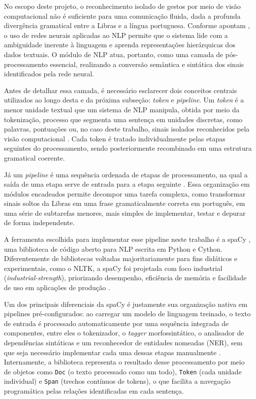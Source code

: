 \documentclass[
    12pt,                %
    openright,           %
    oneside,             %
    a4paper,             %
    english,             %
    brazil               %
]{abntex2}
\begin{document}
No escopo deste projeto, o reconhecimento isolado de gestos por meio de visão computacional não é suficiente para uma comunicação fluida, dada a profunda divergência gramatical entre a Libras e a língua portuguesa. Conforme apontam , o uso de redes neurais aplicadas ao NLP permite que o sistema lide com a ambiguidade inerente à linguagem e aprenda representações hierárquicas dos dados textuais. O módulo de NLP atua, portanto, como uma camada de pós-processamento essencial, realizando a conversão semântica e sintática dos sinais identificados pela rede neural.

Antes de detalhar essa camada, é necessário esclarecer dois conceitos centrais utilizados ao longo desta e da próxima subseção: \textit{token} e \textit{pipeline}. Um \textit{token} é a menor unidade textual que um sistema de NLP manipula, obtida por meio da tokenização, processo que segmenta uma sentença em unidades discretas, como palavras, pontuações ou, no caso deste trabalho, sinais isolados reconhecidos pela visão computacional \cite{Bird2009}. Cada token é tratado individualmente pelas etapas seguintes do processamento, sendo posteriormente recombinado em uma estrutura gramatical coerente. 

Já um \textit{pipeline} é uma sequência ordenada de etapas de processamento, na qual a saída de uma etapa serve de entrada para a etapa seguinte \cite{Honnibal2020}. Essa organização em módulos encadeados permite decompor uma tarefa complexa, como transformar sinais soltos da Libras em uma frase gramaticalmente correta em português, em uma série de subtarefas menores, mais simples de implementar, testar e depurar de forma independente.

A ferramenta escolhida para implementar esse pipeline neste trabalho é a spaCy \cite{Honnibal2020}, uma biblioteca de código aberto para NLP escrita em Python e Cython. Diferentemente de bibliotecas voltadas majoritariamente para fins didáticos e experimentais, como o NLTK, a spaCy foi projetada com foco industrial (\textit{industrial-strength}), priorizando desempenho, eficiência de memória e facilidade de uso em aplicações de produção \cite{Honnibal2020}.

Um dos principais diferenciais da spaCy é justamente sua organização nativa em pipelines pré-configurados: ao carregar um modelo de linguagem treinado, o texto de entrada é processado automaticamente por uma sequência integrada de componentes, entre eles o tokenizador, o \textit{tagger} morfossintático, o analisador de dependências sintáticas e um reconhecedor de entidades nomeadas (NER), sem que seja necessário implementar cada uma dessas etapas manualmente \cite{Honnibal2020}. Internamente, a biblioteca representa o resultado desse processamento por meio de objetos como \texttt{Doc} (o texto processado como um todo), \texttt{Token} (cada unidade individual) e \texttt{Span} (trechos contínuos de tokens), o que facilita a navegação programática pelas relações identificadas em cada sentença.
\end{document}
